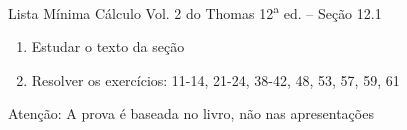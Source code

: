 \documentclass[fleqn,utf8,aspectratio=169,12pt,ignorenonframetext]{beamer}
\begin{document}
\begin{frame}{Lista Mínima}
  Cálculo Vol. 2 do Thomas 12\textsuperscript{a} ed. -- Seção 12.1
  \begin{enumerate}
    \item Estudar o texto da seção
    \item Resolver os exercícios: 11-14, 21-24, 38-42, 48, 53, 57, 59, 61
  \end{enumerate}

  \vfill
  Atenção: A prova é baseada no livro, não nas apresentações
\end{frame}

\end{document}
